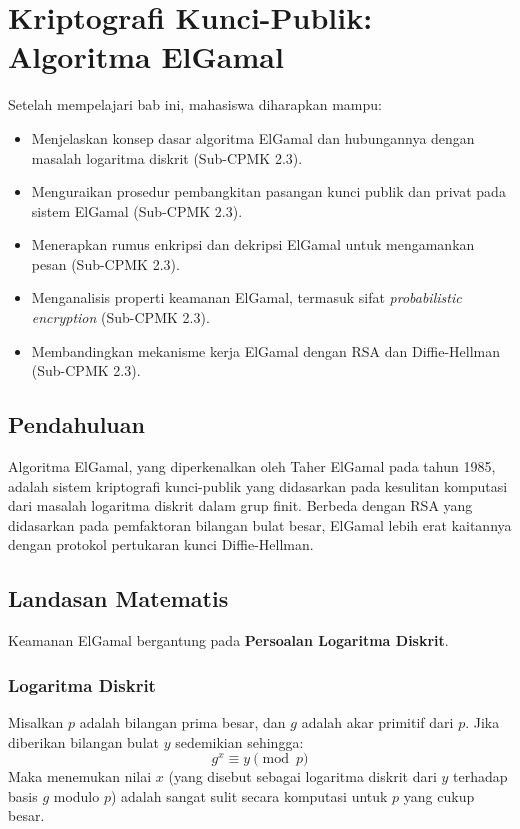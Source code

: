 \documentclass[../main.tex]{subfiles}
\begin{document}
\chapter{Kriptografi Kunci-Publik: Algoritma ElGamal}

\begin{learningoutcome}
Setelah mempelajari bab ini, mahasiswa diharapkan mampu:
\begin{itemize}
    \item Menjelaskan konsep dasar algoritma ElGamal dan hubungannya dengan masalah logaritma diskrit (Sub-CPMK 2.3).
    \item Menguraikan prosedur pembangkitan pasangan kunci publik dan privat pada sistem ElGamal (Sub-CPMK 2.3).
    \item Menerapkan rumus enkripsi dan dekripsi ElGamal untuk mengamankan pesan (Sub-CPMK 2.3).
    \item Menganalisis properti keamanan ElGamal, termasuk sifat \textit{probabilistic encryption} (Sub-CPMK 2.3).
    \item Membandingkan mekanisme kerja ElGamal dengan RSA dan Diffie-Hellman (Sub-CPMK 2.3).
\end{itemize}
\end{learningoutcome}

\section{Pendahuluan}
Algoritma ElGamal, yang diperkenalkan oleh Taher ElGamal pada tahun 1985, adalah sistem kriptografi kunci-publik yang didasarkan pada kesulitan komputasi dari masalah logaritma diskrit dalam grup finit. Berbeda dengan RSA yang didasarkan pada pemfaktoran bilangan bulat besar, ElGamal lebih erat kaitannya dengan protokol pertukaran kunci Diffie-Hellman.

\section{Landasan Matematis}
Keamanan ElGamal bergantung pada \textbf{Persoalan Logaritma Diskrit}.

\subsection{Logaritma Diskrit}
Misalkan $p$ adalah bilangan prima besar, dan $g$ adalah akar primitif dari $p$. Jika diberikan bilangan bulat $y$ sedemikian sehingga:
\[ g^x \equiv y \pmod{p} \]
Maka menemukan nilai $x$ (yang disebut sebagai logaritma diskrit dari $y$ terhadap basis $g$ modulo $p$) adalah sangat sulit secara komputasi untuk $p$ yang cukup besar.
\end{document}
